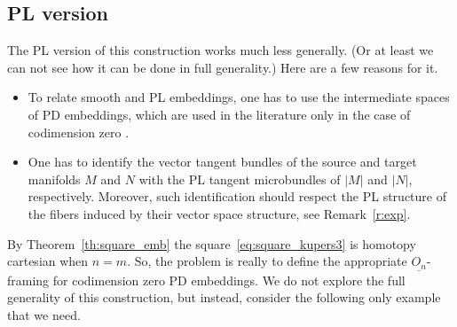 \documentclass[11pt]{amsart}
\theoremstyle{definition}
\newcommand{\Emb}{\mathrm{Emb}}
\newcommand{\Imm}{\mathrm{Imm}}
\newcommand{\pdImm}{\mathrm{pdImm}}
\newcommand{\pdEmb}{\mathrm{pdEmb}}
\numberwithin{equation}{section}
\begin{document}
\subsection{PL version}\label{ss:PL_fr_temb}
The PL version of this construction works much less generally. (Or at least we can not see how it can be done in full generality.) Here are a few reasons for it.

\begin{itemize}
\item To relate smooth and PL embeddings, one has to use the intermediate spaces of PD embeddings, which are used in the literature only 
in the case of codimension zero \cite{BL_diff}.

\item One has to identify the vector tangent bundles of the source and target manifolds $M$ and $N$ with the PL tangent microbundles of $|M|$ and $|N|$, respectively. Moreover, such identification should respect  the PL structure of the fibers induced by their vector space structure, see Remark~\ref{r:exp}.
\end{itemize}

By Theorem~\ref{th:square_emb} the square~\eqref{eq:square_kupers3} is homotopy cartesian when $n=m$. So, the problem is really to define the appropriate  %
$\underline{O_n}$-framing for codimension zero PD embeddings.
We do not explore the full generality of this construction, but instead, consider the following only example that we need. 
\end{document}
